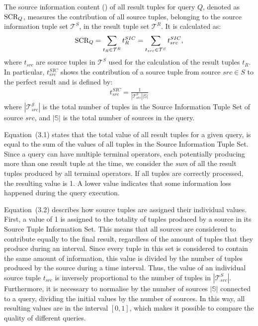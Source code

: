 \begin{definition} {
The source information content (\sic) of all result tuples for query $Q$, 
denoted as $\textrm{SCR}_Q$, measures the contribution of all source tuples, belonging to the source
information tuple set $\mathcal{T}^{S}$, in the result tuple set $\mathcal{T}^R$. It is calculated as: 
\begin{align} 
		\textrm{SCR}_Q = \sum_{t_R \in \mathcal{T}^R} t_{R}^{SIC} = \sum_{t_{src} \in \mathcal{T}^{S}}
		t_{src}^{SIC},
\end{align}
where $t_{src}$ are source tuples in $\mathcal{T}^{S}$ used for the calculation of the
result tuples $t_{R}$. In particular, $t_{src}^{SIC}$ shows the contribution of a source tuple from 
source ${src\in\xspace S}$ to the perfect result and is defined by:
\begin{align}
		t^{SIC}_{src} = \frac{1}{|\mathcal{T}_{src}^{\mathcal{S}}||\mathbb{S}|}
\end{align} 
where $|\mathcal{T}_{src}^{\mathcal{S}}|$ is the total number of tuples in the Source Information Tuple
Set of source $src$, and $|\mathbb{S}|$ is the total number of sources in the query. }
\end{definition}
\vspace{-5pt}
Equation~(3.1) states that the total \sic value of all result tuples for a given query, is equal to the
sum of the \sic values of all tuples in the Source Information Tuple Set. 
Since a query can have multiple terminal operators, each potentially producing more than one result
tuple at the time, we consider the \emph{sum} of all the result tuples produced by all terminal
operators.
If all tuples are correctly processed, the
resulting \sic value is 1. A lower value indicates that some information loss happened
during the query execution.

Equation~(3.2) describes how source tuples are assigned their individual \sic values. First, a value of 1
is assigned to the totality of tuples produced by a source in its Source Tuple Information Set. This
means that all sources are considered to contribute equally to the final result, regardless of the amount
of tuples that they produce during an interval.
Since every tuple in this set is considered to contain the same amount of information, this value is
divided by the number of tuples produced by the source during a time interval.
Thus, the \sic value of an individual source tuple $t_{src}$ is inversely proportional to the number of
tuples in $|\mathcal{T}_{src}^{S}|$. Furthermore, it is necessary to normalise by the number of sources
$|\mathbb{S}|$ connected to a query, dividing the initial \sic values by the number of sources.
In this way, all resulting \sic values are in the interval $[0,1]$, which makes it possible to compare
the quality of different queries.
\vspace{-10pt}
